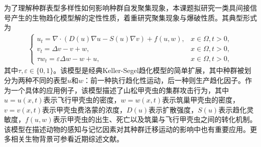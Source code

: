 \documentclass[12pt]{article}
\begin{document}






为了理解种群表型多样性如何影响种群自发聚集现象\cite{Macfarlane2022}，本课题拟研究一类具间接信号产生的生物趋化模型解的定性性质，着重研究聚集现象与爆破性质。其典型形式为
\begin{align}
    \begin{cases}
      \label{sys: ks isp pppf}
        u_t =  \nabla\cdot(D(u)\nabla u - S(u)\nabla v) + f(u,w),& x\in\Omega, t>0,\\
        v_t =  \Delta v - v + w,& x\in\Omega,	 t>0,\\
        \tau w_t  = \varepsilon\Delta w - w + u, & x\in\Omega, t > 0, 
    \end{cases}
\end{align}
其中$\tau,\varepsilon\in\{0,1\}$。该模型是经典Keller-Segel趋化模型\cite{Keller1970}的简单扩展，其中种群被划分为两种不同的表型$u$和$w$：前一种执行趋化性运动，后一种则生产趋化因子。作为一个具体的应用例子，该模型描述了山松甲壳虫的集群攻击行为\cite{Strohm2013}，其中$u=u(x,t)$表示飞行甲壳虫的密度，$w=w(x,t)$表示筑巢甲壳虫的密度，$v=v(x,t)$表示甲壳虫费洛蒙的浓度，$D(u)$表示扩散强度，$S(u)$表示趋化灵敏度，$f(u,w)$表示甲壳虫的出生、死亡以及筑巢与飞行甲壳虫之间的转化机制。该模型在描述动物的感知与记忆因素对其种群迁移运动的影响中也有重要应用\cite{Shi2021}。更多相关生物背景可参看近期综述文献\cite{Winkler2025}。
\end{document}
